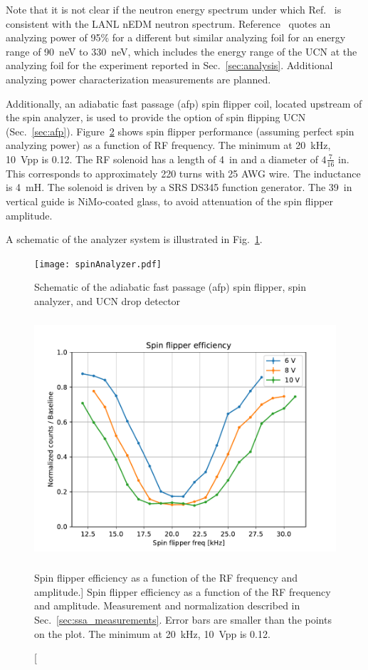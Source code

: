 Note that it is not clear if the neutron energy spectrum under which Ref.~\cite{ThorstenThesis} is consistent with the LANL nEDM neutron spectrum. Reference~\cite{afach_device_2015} quotes an analyzing power of 95\% for a different but similar analyzing foil for an energy range of 90~neV to 330~neV, which includes the energy range of the UCN at the analyzing foil for the experiment reported in Sec.~\ref{sec:analysis}. Additional analyzing power characterization measurements are planned.

Additionally, an adiabatic fast passage (\acrshort{afp}) spin flipper coil, located upstream of the spin analyzer, is used to provide the option of spin flipping UCN (Sec.~\ref{sec:afp}).  Figure~\ref{fig:spin_flipper_efficiency} shows spin flipper performance (assuming perfect spin analyzing power) as a function of RF frequency. The minimum at \qty{20}{kHz}, \qty{10}{Vpp} is 0.12. The RF solenoid has a length of \qty{4}{in} and a diameter of $4\frac{7}{16}\text{ in}$. This corresponds to approximately 220 turns with 25 AWG wire. The inductance is \qty{4}{mH}. The solenoid is driven by a SRS DS345 function generator. The \qty{39}{in} vertical \ucn guide is NiMo-coated glass, to avoid attenuation of the spin flipper amplitude.

A schematic of the analyzer system is illustrated in Fig.~\ref{fig:SpinAnalyzer}.

\begin{figure}
    \centering
    \texttt{[image: spinAnalyzer.pdf]}
    \caption{Schematic of the adiabatic fast passage (\acrshort{afp}) spin flipper, spin analyzer, and UCN drop detector}
    \label{fig:SpinAnalyzer}
\end{figure}

\begin{figure}
    \centering
    \includegraphics[height=3.5in]{figures/spin_flipper_efficiency.pdf}
    \caption
    [Spin flipper efficiency as a function of the RF frequency and amplitude.]
    {Spin flipper efficiency as a function of the RF frequency and amplitude. Measurement and normalization described in Sec.~\ref{sec:ssa_measurements}. Error bars are smaller than the points on the plot. The minimum at \qty{20}{kHz}, \qty{10}{Vpp} is 0.12.}
    \label{fig:spin_flipper_efficiency}
\end{figure}

